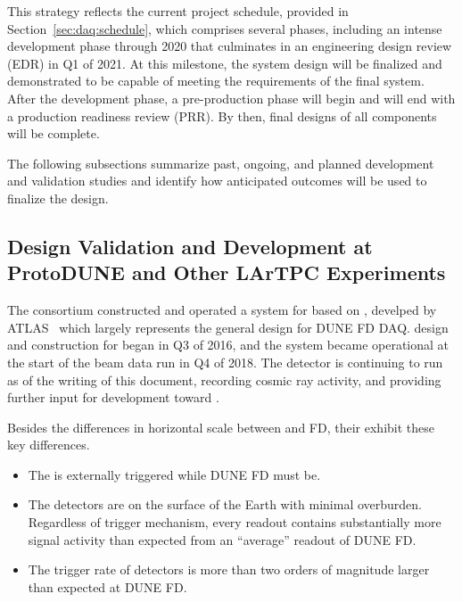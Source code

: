 This strategy reflects the current  project schedule,
provided in Section~\ref{sec:daq:schedule}, which
comprises several phases, including an intense development phase
through 2020 that culminates in an engineering design
review (EDR) in Q1 of 2021. At this milestone, the system design will be
finalized and demonstrated to be capable of meeting the requirements of the
final  system. After the development phase, a
pre-production phase will begin and will end with a production readiness
review (PRR). By then, final designs of all components
will be complete.

The following subsections summarize past, ongoing, and planned
development and validation studies and identify how anticipated outcomes
will be used to finalize the  design.

\subsection{Design Validation and Development at ProtoDUNE and Other
  LArTPC Experiments}


\label{sec:daq:protodune}

The   consortium constructed and operated a
 system for  based on ,
develped by ATLAS~\cite{pdsp-felix} which largely represents the general
design for DUNE FD DAQ.
 design and construction for  began in Q3 of
2016, and the system became operational at the start of the beam data
run in Q4 of 2018.
The detector is continuing to run as of the writing of this document,
recording cosmic ray activity, and providing further input for
 development toward . 

Besides the differences in horizontal scale between 
and  FD, their  exhibit these key differences. 
\begin{itemize}
\item The   is externally triggered while
  DUNE FD must be. 
\item The  detectors are on the surface of the Earth
  with minimal overburden. 
  Regardless of trigger mechanism, every readout contains substantially
  more signal activity than expected from an ``average'' readout of DUNE
  FD.
\item The trigger rate of  detectors is more than two
  orders of magnitude larger than expected at DUNE FD.

\end{itemize}

